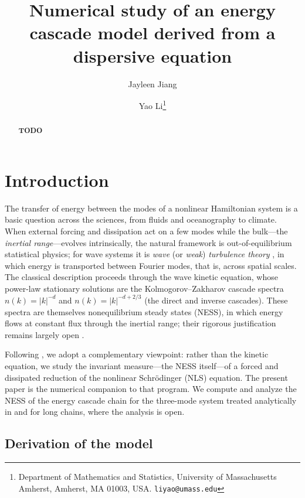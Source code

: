 \documentclass[11pt,a4paper]{article}
\title{Numerical study of an energy cascade model derived from a dispersive equation}
\author{Jayleen Jiang \and Yao Li\thanks{Department of Mathematics and Statistics, University of Massachusetts Amherst, Amherst, MA 01003, USA. \texttt{liyao@umass.edu}}}
\date{}
\theoremstyle{definition}
\numberwithin{equation}{section}   %
\begin{document}
\maketitle

\begin{abstract}
    \textbf{TODO}
\end{abstract}

\section{Introduction}

The transfer of energy between the modes of a nonlinear Hamiltonian system is a
basic question across the sciences, from fluids and oceanography to climate.
When external forcing and dissipation act on a few modes while the bulk---the
\emph{inertial range}---evolves intrinsically, the natural framework is
out-of-equilibrium statistical physics; for wave systems it is \emph{wave} (or
\emph{weak}) \emph{turbulence theory} \cite{Nazarenko}, in which energy is
transported between Fourier modes, that is, across spatial scales. The classical
description proceeds through the wave kinetic equation, whose power-law
stationary solutions are the Kolmogorov--Zakharov cascade spectra
$n(k)=|k|^{-d}$ and $n(k)=|k|^{-d+2/3}$ (the direct and inverse cascades). These
spectra are themselves nonequilibrium steady states (NESS), in which energy
flows at constant flux through the inertial range; their rigorous justification
remains largely open \cite{HLNS}.

Following \cite{HLNS}, we adopt a complementary viewpoint: rather than the
kinetic equation, we study the invariant measure---the NESS itself---of a
forced and dissipated reduction of the nonlinear Schr\"odinger (NLS) equation.
The present paper is the numerical companion to that program. We compute and
analyze the NESS of the energy cascade chain for the three-mode system treated
analytically in \cite{HLNS} and for long chains, where the analysis is open.

\subsection{Derivation of the model}\label{sec:derivation}
\end{document}
